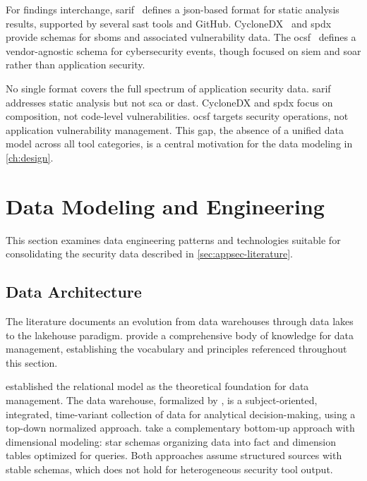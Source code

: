 For findings interchange, \gls{sarif}~\parencite{OASIS2024} defines a \gls{json}-based format for static analysis results, supported by several \gls{sast} tools and GitHub. CycloneDX~\parencite{CycloneDX2024} and \gls{spdx}~\parencite{SPDX2024} provide schemas for \glspl{sbom} and associated vulnerability data. The \gls{ocsf}~\parencite{OCSF2024} defines a vendor-agnostic schema for cybersecurity events, though focused on \gls{siem} and \gls{soar} rather than application security.

No single format covers the full spectrum of application security data. \gls{sarif} addresses static analysis but not \gls{sca} or \gls{dast}. CycloneDX and \gls{spdx} focus on composition, not code-level vulnerabilities. \gls{ocsf} targets security operations, not application vulnerability management. This gap, the absence of a unified data model across all tool categories, is a central motivation for the data modeling in \autoref{ch:design}.


\section{Data Modeling and Engineering}
\label{sec:data-literature}

This section examines data engineering patterns and technologies suitable for consolidating the security data described in \autoref{sec:appsec-literature}.


\subsection{Data Architecture}
\label{sec:data-architecture}

The literature documents an evolution from data warehouses through data lakes to the lakehouse paradigm. \textcite{DAMA2017} provide a comprehensive body of knowledge for data management, establishing the vocabulary and principles referenced throughout this section.

\textcite{Codd1970} established the relational model as the theoretical foundation for data management. The data warehouse, formalized by \textcite{Inmon2005}, is a subject-oriented, integrated, time-variant collection of data for analytical decision-making, using a top-down normalized approach. \textcite{Kimball2013} take a complementary bottom-up approach with dimensional modeling: star schemas organizing data into fact and dimension tables optimized for queries. Both approaches assume structured sources with stable schemas, which does not hold for heterogeneous security tool output.

